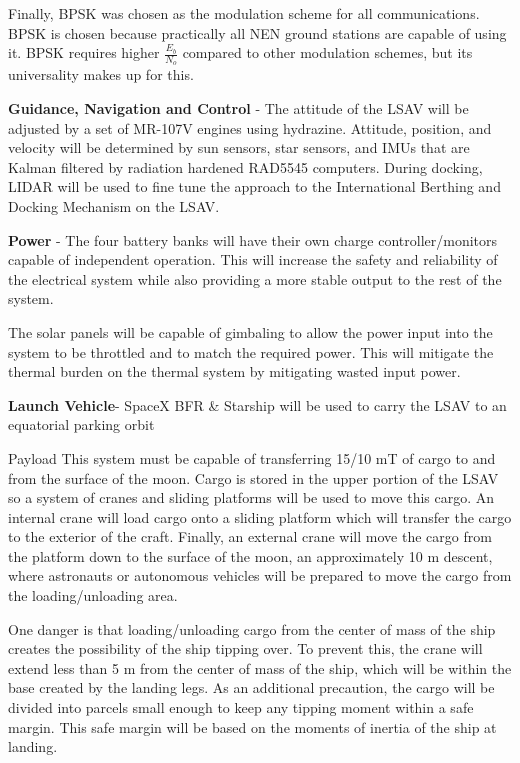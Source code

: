 \documentclass[10pt]{article}
\begin{document}
Finally, BPSK was chosen as the modulation scheme for all
communications. BPSK is chosen because practically all NEN ground
stations are capable of using it. BPSK requires higher \(\frac{E_b}{N_o}\)
compared to other modulation schemes, but its universality makes up
for this.

\textbf{Guidance, Navigation and Control} - The attitude of the LSAV
will be adjusted by a set of MR-107V engines using
hydrazine. Attitude, position, and velocity will be determined by sun
sensors, star sensors, and IMUs that are Kalman filtered by radiation
hardened RAD5545 computers. During docking, LIDAR will be used to fine
tune the approach to the International Berthing and Docking Mechanism
on the LSAV.

\textbf{Power} - The four battery banks will have their own charge
controller/monitors capable of independent operation. This will
increase the safety and reliability of the electrical system while
also providing a more stable output to the rest of the system.


The solar panels will be capable of gimbaling to allow the power input
into the system to be throttled and to match the required power. This
will mitigate the thermal burden on the thermal system by mitigating
wasted input power.

\textbf{Launch Vehicle}- SpaceX BFR \& Starship will be used to carry the LSAV
to an equatorial parking orbit

Payload This system must be capable of transferring 15/10 mT of cargo
to and from the surface of the moon. Cargo is stored in the upper
portion of the LSAV so a system of cranes and sliding platforms will
be used to move this cargo. An internal crane will load cargo onto a
sliding platform which will transfer the cargo to the exterior of the
craft. Finally, an external crane will move the cargo from the
platform down to the surface of the moon, an approximately 10 m
descent, where astronauts or autonomous vehicles will be prepared to
move the cargo from the loading/unloading area.

One danger is that loading/unloading cargo from the center of mass of
the ship creates the possibility of the ship tipping over. To prevent
this, the crane will extend less than 5 m from the center of mass of
the ship, which will be within the base created by the landing
legs. As an additional precaution, the cargo will be divided into
parcels small enough to keep any tipping moment within a safe
margin. This safe margin will be based on the moments of inertia of
the ship at landing.
\end{document}
